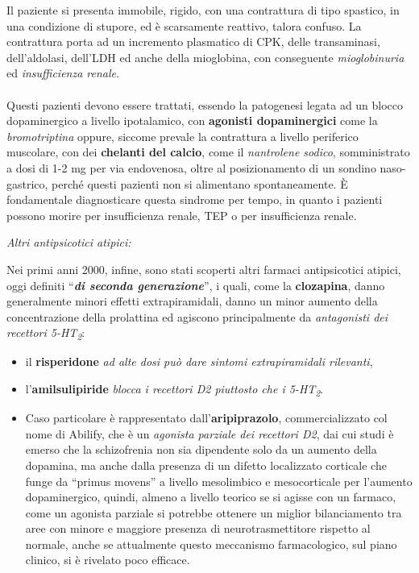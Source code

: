 \begin{itemize}
Il paziente si presenta immobile, rigido, con una contrattura di tipo
spastico, in una condizione di stupore, ed è scarsamente reattivo,
talora confuso. La contrattura porta ad un incremento plasmatico di CPK,
delle transaminasi, dell'aldolasi, dell'LDH ed anche della mioglobina,
con conseguente \emph{mioglobinuria} ed \emph{insufficienza renale}.
\\\\
Questi pazienti devono essere trattati, essendo la patogenesi legata ad
un blocco dopaminergico a livello ipotalamico, con \textbf{agonisti
dopaminergici} come la \emph{bromotriptina} oppure, siccome prevale la
contrattura a livello periferico muscolare, con dei \textbf{chelanti del
calcio}, come il \emph{nantrolene sodico}, somministrato a dosi di 1-2
mg per via endovenosa, oltre al posizionamento di un sondino
naso-gastrico, perché questi pazienti non si alimentano spontaneamente.
È fondamentale diagnosticare questa sindrome per tempo, in quanto i
pazienti possono morire per insufficienza renale, TEP o per
insufficienza renale.
\end{itemize}

\emph{\emph{Altri antipsicotici atipici:}}

Nei primi anni 2000, infine, sono stati scoperti altri farmaci
antipsicotici atipici, oggi definiti ``\textbf{\emph{di seconda
generazione}}'', i quali, come la \textbf{clozapina}, danno generalmente
minori effetti extrapiramidali, danno un minor aumento della
concentrazione della prolattina ed agiscono principalmente da
\emph{antagonisti dei recettori 5-HT\textsubscript{2}}:

\begin{itemize}
\item
  il \textbf{risperidone} \emph{ad alte dosi può dare sintomi
  extrapiramidali rilevanti},
\item
  l'\textbf{amilsulipiride} \emph{blocca i recettori D2 piuttosto che i
  5-HT\textsubscript{2}}.
\item
  Caso particolare è rappresentato dall'\textbf{aripiprazolo},
  commercializzato col nome di Abilify, che è un \emph{agonista parziale
  dei recettori D2}, dai cui studi è emerso che la schizofrenia non sia
  dipendente solo da un aumento della dopamina, ma anche dalla presenza
  di un difetto localizzato corticale che funge da ``primus movens'' a
  livello mesolimbico e mesocorticale per l'aumento dopaminergico,
  quindi, almeno a livello teorico se si agisse con un farmaco, come un
  agonista parziale si potrebbe ottenere un miglior bilanciamento tra
  aree con minore e maggiore presenza di neurotrasmettitore rispetto al
  normale, anche se attualmente questo meccanismo farmacologico, sul
  piano clinico, si è rivelato poco efficace.
\end{itemize}

